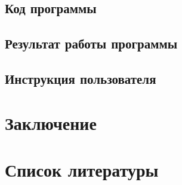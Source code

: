 \documentclass[simple,14pt]{eskdtext}
\begin{document}
	\subsection{Код программы}
	\subsection{Результат работы программы}
	\subsection{Инструкция пользователя}
	
	\section*{Заключение}
	\section{Список  литературы}
\end{document}

